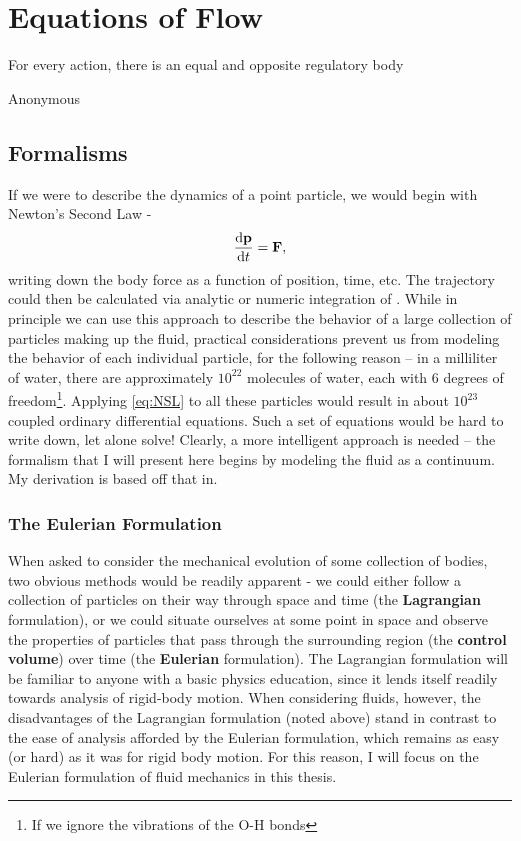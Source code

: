 \setcounter{secnumdepth}{3}
\chapter{Equations of Flow}
    	 	\epigraph{For every action, there is an equal and opposite regulatory body}{Anonymous}
\section{Formalisms}
If we were to describe the dynamics of a point particle, we would begin with Newton's Second Law - 
\begin{equation}\label{eq:NSL}
\der{1}{\Vector{p}}{t} = \Vector{F}, 
\end{equation}
writing down the body force as a function of position, time, etc. The trajectory could then be calculated via analytic or numeric integration of . While in principle we can use this approach to describe the behavior of a large collection of particles making up the fluid, practical considerations prevent us from modeling the behavior of each individual particle, for the following reason -- in a milliliter of water, there are approximately $10^{22}$ molecules of water, each with 6 degrees of freedom\footnote{If we ignore the vibrations of the O-H bonds}. Applying \eqref{eq:NSL} to all these particles would result in about $10^{23}$ coupled ordinary differential equations. Such a set of equations would be hard to write down, let alone solve! Clearly, a more intelligent approach is needed -- the formalism that I will present here begins by modeling the fluid as a continuum. My derivation is based off that in. \\

\subsection{The Eulerian Formulation}

When asked to consider the mechanical evolution of some collection of bodies, two obvious methods would be readily apparent - we could either follow a collection of particles on their way through space and time (the {\bf Lagrangian} formulation), or we could situate ourselves at some point in space and observe the properties of particles that pass through the surrounding region (the {\bf control volume}) over time (the {\bf Eulerian} formulation). The Lagrangian formulation will be familiar to anyone with a basic physics education, since it lends itself readily towards analysis of rigid-body motion. When considering fluids, however, the disadvantages of the Lagrangian formulation (noted above) stand in contrast to the ease of analysis afforded by the Eulerian formulation, which remains as easy (or hard) as it was for rigid body motion. For this reason, I will focus on the Eulerian formulation of fluid mechanics in this thesis. 

